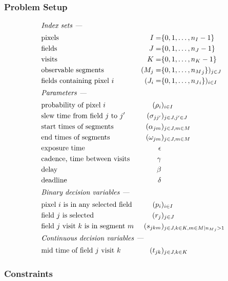 \documentclass[twocolumn,times]{aastex631}
\begin{document}
\subsubsection{Problem Setup}

\begin{alignat*}{4}
\intertext{\it Index sets ---}
    &\text{pixels}&
        I =& \{0, 1, \dots, n_I - 1\} \\
    &\text{fields}&
        J =& \{0, 1, \dots, n_J - 1\} \\
    &\text{visits}&
        K =& \{0, 1, \dots, n_K - 1\} \\
    &\text{observable segments}&
        (M_j =& \{0, 1, \dots, {n_M}_j\})_{j \in J} \\
    &\text{fields containing pixel $i$}&
        (J_i =& \{0, 1, \dots, {n_J}_i\})_{i \in I} \\
\intertext{\it Parameters ---}
    &\text{probability of pixel $i$}&
        (\rho_i&)_{i \in I} \\
    &\text{slew time from field $j$ to $j^\prime$}&
        (\sigma_{jj^\prime}&)_{j \in J, j^\prime \in J} \\
    &\text{start times of segments}&
        (\alpha_{jm}&)_{j \in J, m \in M} \\
    &\text{end times of segments}&
        (\omega_{jm}&)_{j \in J, m \in M} \\
    &\text{exposure time}&
        \epsilon& \\
    &\text{cadence, time between visits}&
        \gamma& \\
    &\text{delay}&
        \beta& \\
    &\text{deadline}&
        \delta& \\
\intertext{\it Binary decision variables ---}
    &\text{pixel $i$ is in any selected field}&
        (p_i&)_{i \in I} \\
    &\text{field $j$ is selected}&
        (r_j&)_{j \in J} \\
    &\text{field $j$ visit $k$ is in segment $m$}&
        (s_{jkm}&)_{j \in J, k \in K, m \in M \mid {n_M}_j > 1} \\
\intertext{\it Continuous decision variables ---}
    &\text{mid time of field $j$ visit $k$}& (t_{jk}&)_{j \in J, k \in K}
\end{alignat*}

\subsubsection{Constraints}
\end{document}
